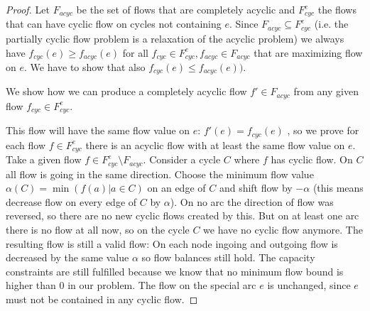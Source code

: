 \begin{proof}
 Let $F_{acyc}$ be the set of flows that are completely acyclic and $F_{cyc}^e$ the flows that can have cyclic flow on 
 cycles not containing $e$. Since $F_{acyc}\subseteq F_{cyc}^e $ (i.e. the partially cyclic flow problem is a 
 relaxation of the acyclic problem) we always have $f_{cyc}(e)\ge f_{acyc}(e)$ for all $f_{cyc}\in F_{cyc}^e, 
f_{acyc}\in F_{acyc}$ that are maximizing flow on $e$. We have to show that also $f_{cyc}(e)\le f_{acyc}(e))$.

We show how we can produce a completely acyclic flow $f'\in F_{acyc}$ from any given flow $f_{cyc}\in F_{cyc}^e$. 

This flow will have the same flow value on $e$: $f'(e)=f_{cyc}(e)$ , so we prove for each flow $f\in F_{cyc}^e$ there 
is an acyclic flow with at least the same flow value on $e$.\\

Take a given flow $f\in F_{cyc}^e\setminus F_{acyc}$. Consider a cycle $C$ where $f$ has cyclic flow. On $C$ all flow 
is going in the same direction. Choose the minimum flow value $\alpha(C)=\min(f(a)|a\in C)$ on an edge of $C$ and shift 
flow by $-\alpha$ (this means decrease flow on every edge of $C$ by $\alpha$). On no arc the direction of flow was 
reversed, so there are no new cyclic flows created by this. But on at least one arc there is no flow at all now, 
so on the cycle $C$ we have no cyclic flow anymore. 
The resulting flow is still a valid flow: On each node ingoing and outgoing flow is decreased by the same value $\alpha$ 
so flow balances still hold. The capacity constraints are still fulfilled because we know that no minimum flow bound is 
higher than 0 in our problem. The flow on the special arc $e$ is unchanged, since $e$ must not be contained in any 
cyclic flow.


\end{proof}
